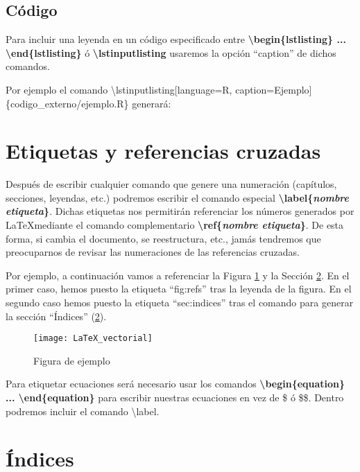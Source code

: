 \subsection{Código}

Para incluir una leyenda en un código especificado entre \textbf{\textbackslash begin\{lstlisting\} ... \textbackslash end\{lstlisting\}} ó \textbf{\textbackslash lstinputlisting} usaremos la opción ``caption'' de dichos comandos.

Por ejemplo el comando \textbackslash lstinputlisting[language=R, caption=Ejemplo] \{codigo\_externo/ejemplo.R\} generará:



\section{Etiquetas y referencias cruzadas}

Después de escribir cualquier comando que genere una numeración (capítulos, secciones, leyendas, etc.) podremos escribir el comando especial \textbf{\textbackslash label\{\emph{nombre etiqueta}\}}. Dichas etiquetas nos permitirán referenciar los números generados por \LaTeX mediante el comando complementario \textbf{\textbackslash ref\{\emph{nombre etiqueta}\}}. De esta forma, si cambia el documento, se reestructura, etc., jamás tendremos que preocuparnos de revisar las numeraciones de las referencias cruzadas.

Por ejemplo, a continuación vamos a referenciar la Figura \ref{fig:refs} y la Sección \ref{sec:indices}. En el primer caso, hemos puesto la etiqueta ``fig:refs'' tras la leyenda de la figura. En el segundo caso hemos puesto la etiqueta ``sec:indices'' tras el comando para generar la sección ``Índices'' (\ref{sec:indices}).

\begin{figure}[h]
	\centering
	\texttt{[image: LaTeX\_vectorial]}
	\caption{Figura de ejemplo}	
	\label{fig:refs}
\end{figure}

Para etiquetar ecuaciones será necesario usar los comandos \textbf{\textbackslash begin\{equation\} ... \textbackslash end\{equation\}} para escribir nuestras ecuaciones en vez de \$ ó \$\$. Dentro podremos incluir el comando \textbackslash label.

\section{Índices}
\label{sec:indices}

